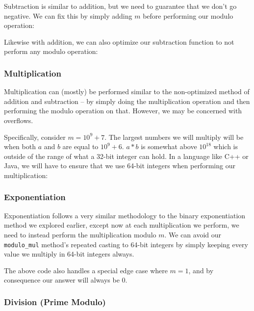 Subtraction is similar to addition, but we need to guarantee that we don't go negative. We can fix this by simply adding $m$ before performing our modulo operation:


Likewise with addition, we can also optimize our subtraction function to not perform any modulo operation:


\subsubsection{Multiplication}

Multiplication can (mostly) be performed similar to the non-optimized method of addition and subtraction -- by simply doing the multiplication operation and then performing the modulo operation on that. However, we may be concerned with overflows.

Specifically, consider $m = 10^9 + 7$. The largest numbers we will multiply will be when both $a$ and $b$ are equal to $10^9 + 6$. $a * b$ is somewhat above $10^{18}$ which is outside of the range of what a 32-bit integer can hold. In a language like C++ or Java, we will have to ensure that we use 64-bit integers when performing our multiplication:


\subsubsection{Exponentiation}

Exponentiation follows a very similar methodology to the binary exponentiation method we explored earlier, except now at each multiplication we perform, we need to instead perform the multiplication modulo $m$. We can avoid our \texttt{modulo_mul} method's repeated casting to 64-bit integers by simply keeping every value we multiply in 64-bit integers always.


The above code also handles a special edge case where $m = 1$, and by consequence our answer will always be $0$.

\subsubsection{Division (Prime Modulo)}

